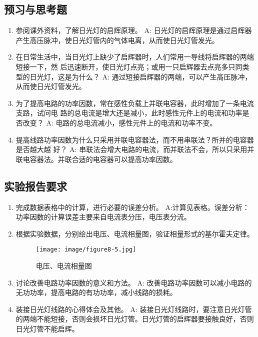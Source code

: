 \documentclass[UTF8]{article}
\begin{document}
        \subsection{预习与思考题}
            \begin{enumerate}[label=\textbf{\arabic*}.]
                \item 参阅课外资料，了解日光灯的启辉原理。\newline
                A: 日光灯的启辉原理是通过启辉器产生高压脉冲，使日光灯管内的气体电离，从而使日光灯管发光。
                \item 在日常生活中，当日光灯上缺少了启辉器时，人们常用一导线将启辉器的两端短接一下，然
                后迅速断开，使日光灯点亮；或用一只启辉器去点亮多只同类型的日光灯，这是为什么？\newline
                A: 通过短接启辉器的两端，可以产生高压脉冲，从而使日光灯管发光。
                \item 为了提高电路的功率因数，常在感性负载上并联电容器，此时增加了一条电流支路，试问电
                路的总电流是增大还是减小，此时感性元件上的电流和功率是否改变？\newline
                A: 电路的总电流减小，感性元件上的电流和功率不变。
                \item 提高线路功率因数为什么只采用并联电容器法，而不用串联法？所并的电容器是否越大越
                好？\newline
                A: 串联法会增大电路的电流，而并联法不会，所以只采用并联电容器法。并联合适的电容器可以提高功率因数。
            \end{enumerate}
        \subsection{实验报告要求}
            \begin{enumerate}[label=\textbf{\arabic*}.]
                \item 完成数据表格中的计算，进行必要的误差分析。
                A:计算见表格。误差分析：功率因数的计算误差主要来自电流表分压，电压表分流。
                \item 根据实验数据，分别绘出电压、电流相量图，验证相量形式的基尔霍夫定律。
                \begin{figure}[H]
                    \centering
                    \texttt{[image: image/figure8-5.jpg]}
                    \caption{电压、电流相量图}
                \end{figure}
                \item 讨论改善电路功率因数的意义和方法。\newline
                A: 改善电路功率因数可以减小电路的无功功率，提高电路的有功功率，减小线路的损耗。
                \item 装接日光灯线路的心得体会及其他。 \newline
                A: 装接日光灯线路时，要注意日光灯管的两端不能短接，否则会损坏日光灯管。日光灯管的启辉器要接触良好，否则日光灯管不能启辉。
            \end{enumerate}
\end{document}
